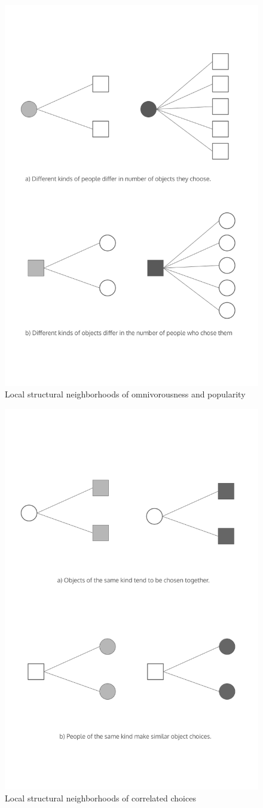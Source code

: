\documentclass[preprint,12pt,authoryear]{elsarticle}
\begin{document}
\begin{figure}
    \centering
    \includegraphics[width=0.8\linewidth]{Figs/local-struct1.png}
    \caption{Local structural neighborhoods of omnivorousness and popularity}
    \label{fig:local-struct1}
\end{figure}
\newpage
\begin{figure}
    \centering
    \includegraphics[width=0.8\linewidth]{Figs/local-struct2.png}
    \caption{Local structural neighborhoods of correlated choices}
    \label{fig:local-struct2}
\end{figure}
\end{document}
